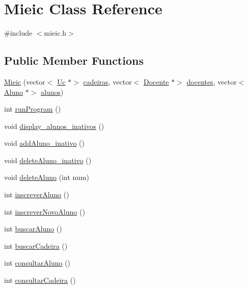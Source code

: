 \hypertarget{class_mieic}{}\section{Mieic Class Reference}
\label{class_mieic}


{\ttfamily \#include $<$mieic.\+h$>$}

\subsection*{Public Member Functions}
\begin{DoxyCompactItemize}
\item 
\hyperlink{class_mieic_ad42e035c1e9be5fd8d526761c7bb8418}{Mieic} (vector$<$ \hyperlink{class_uc}{Uc} $\ast$$>$ \hyperlink{class_mieic_afc2464f50b64724c74c369a252d10a0f}{cadeiras}, vector$<$ \hyperlink{class_docente}{Docente} $\ast$$>$ \hyperlink{class_mieic_a7adb63b4146994f9a4a83eab412d2cae}{docentes}, vector$<$ \hyperlink{class_aluno}{Aluno} $\ast$$>$ \hyperlink{class_mieic_a3840d1d5343ac6ac8b42e698e6cfde3e}{alunos})
\item 
int \hyperlink{class_mieic_a0aed4ed8f9ba31122b083f018954fdf7}{run\+Program} ()
\item 
void \hyperlink{class_mieic_ae92698b870074dccf12fd789e772a813}{display\+\_\+alunos\+\_\+inativos} ()
\item 
void \hyperlink{class_mieic_a66aaefa0f9fa891046c3d9429cf700f0}{add\+Aluno\+\_\+inativo} ()
\item 
void \hyperlink{class_mieic_a50f58ffae6adb088bb0cc0fddfa18a00}{delete\+Aluno\+\_\+inativo} ()
\item 
void \hyperlink{class_mieic_aa5def5f9735af4ea7a92f81e4415eecc}{delete\+Aluno} (int num)
\item 
int \hyperlink{class_mieic_a00d811a1d6f6ce0fa591df08dffe535b}{inscrever\+Aluno} ()
\item 
int \hyperlink{class_mieic_ae8cda55b53cbf1cbc9063bee1c61c01f}{inscrever\+Novo\+Aluno} ()
\item 
int \hyperlink{class_mieic_a6f7e179dcb9cb355c86020b65a550a83}{buscar\+Aluno} ()
\item 
int \hyperlink{class_mieic_ac63c0ee6a6edbbf7aaebdea568994905}{buscar\+Cadeira} ()
\item 
int \hyperlink{class_mieic_a48e0f6b686af40c81362e9f8cf35051e}{consultar\+Aluno} ()
\item 
int \hyperlink{class_mieic_a258308b6c121103c1de1740e5ec2318b}{consultar\+Cadeira} ()
\item 
$$
\end{DoxyCompactItemize}
